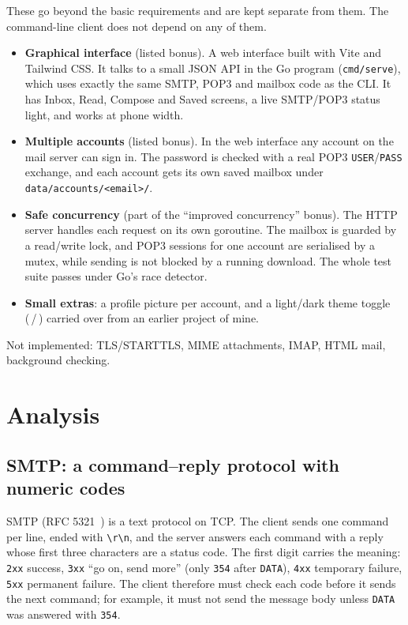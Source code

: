 \documentclass[11pt,a4paper]{article}
\begin{document}
These go beyond the basic requirements and are kept separate from them. The command-line
client does not depend on any of them.

\begin{itemize}
  \item {} \textbf{Graphical interface} (listed bonus). A web interface built with
        Vite and Tailwind CSS. It talks to a small JSON API in the Go program
        (\texttt{cmd/serve}), which uses exactly the same SMTP, POP3 and mailbox code as the CLI.
        It has Inbox, Read, Compose and Saved screens, a live SMTP/POP3 status light, and works
        at phone width.
  \item {} \textbf{Multiple accounts} (listed bonus). In the web interface any account
        on the mail server can sign in. The password is checked with a real POP3
        \texttt{USER}/\texttt{PASS} exchange, and each account gets its own saved mailbox
        under \texttt{data/accounts/<email>/}.
  \item {} \textbf{Safe concurrency} (part of the ``improved concurrency'' bonus). The HTTP
        server handles each request on its own goroutine. The mailbox is guarded by a
        read/write lock, and POP3 sessions for one account are serialised by a mutex, while
        sending is not blocked by a running download. The whole test suite passes under
        Go's race detector.
  \item \textbf{Small extras}: a profile picture per account, and a light/dark theme toggle
        (\,/\,) carried over from an earlier project of mine.
\end{itemize}

Not implemented: TLS/STARTTLS, MIME attachments, IMAP, HTML mail, background checking.

\section{Analysis}

\subsection{SMTP: a command--reply protocol with numeric codes}

SMTP (RFC 5321~\cite{rfc5321}) is a text protocol on TCP. The client sends one command per
line, ended with \verb|\r\n|, and the server answers each command with a reply whose
first three characters are a status code. The first digit carries the meaning:
\texttt{2xx} success, \texttt{3xx} ``go on, send more'' (only \texttt{354} after
\texttt{DATA}), \texttt{4xx} temporary failure, \texttt{5xx} permanent failure. The client
therefore must check each code before it sends the next command; for example, it must not
send the message body unless \texttt{DATA} was answered with \texttt{354}.
\end{document}
